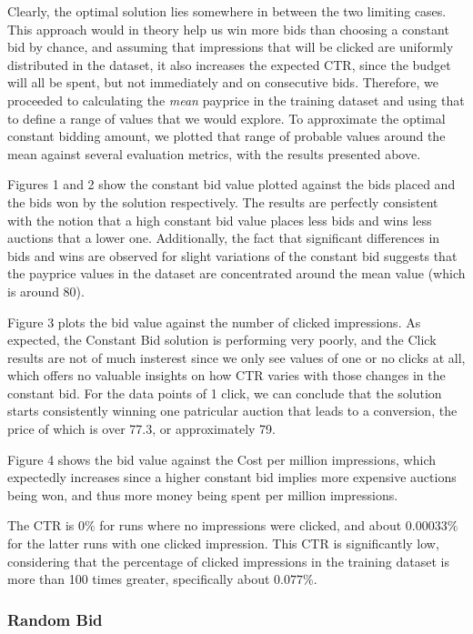 \documentclass{sig-alternate-05-2015}
\begin{document}
Clearly, the optimal solution lies somewhere in between the two limiting cases. This approach would in theory help us win more bids than choosing a constant bid by chance, and assuming that impressions that will be clicked are uniformly distributed in the dataset, it also increases the expected CTR, since the budget will all be spent, but not immediately and on consecutive bids. Therefore, we proceeded to calculating the \textit{mean} payprice in the training dataset and using that to define a range of values that we would explore. To approximate the optimal constant bidding amount, we plotted that range of probable values around the mean against several evaluation metrics, with the results presented above. 

Figures 1 and 2 show the constant bid value plotted against the bids placed and the bids won by the solution respectively. The results are perfectly consistent with the notion that a high constant bid value places less bids and wins less auctions that a lower one. Additionally, the fact that significant differences in bids and wins are observed for slight variations of the constant bid suggests that the payprice values in the dataset are concentrated around the mean value (which is around 80).

Figure 3 plots the bid value against the number of clicked impressions. As expected, the Constant Bid solution is performing very poorly, and the Click results are not of much insterest since we only see values of one or no clicks at all, which offers no valuable insights on how CTR varies with those changes in the constant bid. For the data points of 1 click, we can conclude that the solution starts consistently winning one patricular auction that leads to a conversion, the price of which is over 77.3, or approximately 79.

Figure 4 shows the bid value against the Cost per million impressions, which expectedly increases since a higher constant bid implies more expensive auctions being won, and thus more money being spent per million impressions.

The CTR is $0\%$ for runs where no impressions were clicked, and about $0.00033\%$ for the latter runs with one clicked impression. This CTR is significantly low, considering that the percentage of clicked impressions in the training dataset is more than 100 times greater, specifically about $0.077\%$.

\subsubsection{Random Bid}
\end{document}
